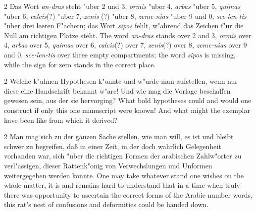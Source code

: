\documentclass[10pt,a4paper]{article}
\renewcommand{\switchcolumn}{\syncronize\nointerlineskip\columnbreak}
\begin{document}
\begin{paracol}{2}
Das Wort \textit{an-dras} steht "uber 2 und 3, \textit{ormis} "uber 4, \textit{arbas} "uber 5, \textit{quimas} "uber 6, \textit{calcis}(?) "uber 7, \textit{zenis} (?) "uber 8, \textit{zeme-nias} "uber 9 und 0, \textit{sce-len-tis} "uber drei leeren F"achern; das Wort \textit{sipos} fehlt, w"ahrend das Zeichen f"ur die Null am richtigen Platze steht.
\switchcolumn
The word \textit{an-dras} stands over 2 and 3, \textit{ormis} over 4, \textit{arbas} over 5, \textit{quimas} over 6, \textit{calcis}(?) over 7, \textit{zenis}(?) over 8, \textit{zeme-nias} over 9 and 0, \textit{sce-len-tis} over three empty compartments; the word \textit{sipos} is missing, while the sign for zero stands in the correct place.
\end{paracol}

\begin{paracol}{2}
Welche k"uhnen Hypothesen k"onnte und w"urde man aufstellen, wenn nur diese eine Handschrift bekannt w"are! Und wie mag die Vorlage beschaffen gewesen sein, aus der sie hervorging?
\switchcolumn
What bold hypotheses could and would one construct if only this one manuscript were known! And what might the exemplar have been like from which it derived?
\end{paracol}

\begin{paracol}{2}
Man mag sich zu der ganzen Sache stellen, wie man will, es ist und bleibt schwer zu begreifen, da\ss{} in einer Zeit, in der doch wahrlich Gelegenheit vorhanden war, sich "uber die richtigen Formen der arabischen Zahlw"orter zu verl"assigen, dieser Rattenk"onig von Verwechslungen und Unformen weitergegeben werden konnte.
\switchcolumn
One may take whatever stand one wishes on the whole matter, it is and remains hard to understand that in a time when truly there was opportunity to ascertain the correct forms of the Arabic number words, this rat's nest of confusions and deformities could be handed down.
\end{paracol}
\end{document}
